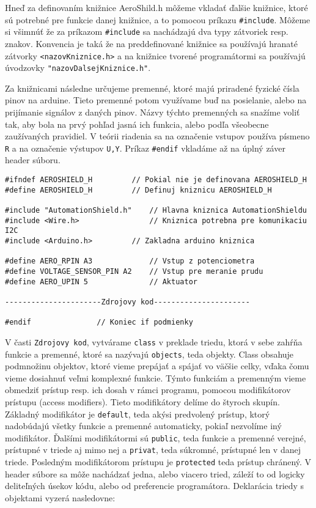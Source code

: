 Hneď za definovaním knižnice AeroShild.h môžeme vkladať ďalšie knižnice, ktoré sú potrebné pre funkcie danej knižnice, a to pomocou príkazu \verb|#include|. Môžeme si všimnúť že za príkazom \verb|#include| sa nachádzajú dva typy zátvoriek resp. znakov. Konvencia je taká že na preddefinované knižnice sa používajú hranaté zátvorky \verb|<nazovKniznice.h>| a na knižnice tvorené programátormi sa používajú úvodzovky \verb|"nazovDalsejKniznice.h"|.

Za knižnicami následne určujeme premenné, ktoré majú priradené fyzické čísla pinov na arduine. Tieto premenné potom využívame buď na posielanie, alebo na prijímanie signálov z daných pinov. Názvy týchto premenných sa snažíme voliť tak, aby bola na prvý pohľad jasná ich funkcia, alebo podľa všeobecne zaužívaných pravidiel. V teórii riadenia sa na označenie vstupov používa písmeno \verb|R| a na označenie výstupov \verb|U,Y|. Príkaz \verb|#endif| vkladáme až na úplný záver header súboru.

\begin{lstlisting}[caption={Ukážka zdrojového kódu headeru.},captionpos=b]
#ifndef AEROSHIELD_H	 	 // Pokial nie je definovana AEROSHIELD_H
#define AEROSHIELD_H	 	 // Definuj kniznicu AEROSHIELD_H

#include "AutomationShield.h"    // Hlavna kniznica AutomationShieldu
#include <Wire.h>                // Kniznica potrebna pre komunikaciu I2C
#include <Arduino.h>		 // Zakladna arduino kniznica

#define AERO_RPIN A3             // Vstup z potenciometra
#define VOLTAGE_SENSOR_PIN A2    // Vstup pre meranie prudu 
#define AERO_UPIN 5              // Aktuator

----------------------Zdrojovy kod----------------------

#endif			   	 // Koniec if podmienky 
\end{lstlisting}



V časti \verb|Zdrojovy kod|, vytvárame \verb|class| v preklade triedu, ktorá v sebe zahŕňa funkcie a premenné, ktoré sa nazývajú \verb|objects|, teda objekty. Class obsahuje podmnožinu objektov, ktoré vieme prepájať a spájať vo väčšie celky, vďaka čomu vieme dosiahnuť veľmi komplexné funkcie. Týmto funkciám a premenným vieme obmedziť prístup resp. ich dosah v rámci programu, pomocou modifikátorov prístupu (access modifiers). Tieto modifikátory delíme do štyroch skupín. Základný modifikátor je \verb|default|, teda akýsi predvolený prístup, ktorý nadobúdajú všetky funkcie a premenné automaticky, pokiaľ nezvolíme iný modifikátor. Ďalšími modifikátormi sú \verb|public|, teda funkcie a premenné verejné, prístupné v triede aj mimo nej a \verb|privat|, teda súkromné, prístupné len v danej triede. Posledným modifikátorom prístupu je \verb|protected| teda prístup chránený. V header súbore sa môže nachádzať jedna, alebo viacero tried, záleží to od logicky deliteľných úsekov kódu, alebo od preferencie programátora. Deklarácia triedy s objektami vyzerá nasledovne: 

